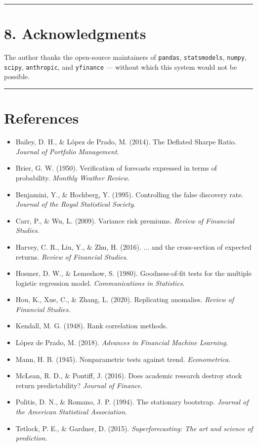 \documentclass[11pt,a4paper]{article}
\begin{document}
\medskip\hrule\medskip

\section{8. Acknowledgments}

The author thanks the open-source maintainers of \texttt{pandas}, \texttt{statsmodels}, \texttt{numpy}, \texttt{scipy}, \texttt{anthropic}, and \texttt{yfinance} — without which this system would not be possible.

\medskip\hrule\medskip

\section{References}

\begin{itemize}[leftmargin=*]
\item Bailey, D. H., \& López de Prado, M. (2014). The Deflated Sharpe Ratio. \textit{Journal of Portfolio Management}.
\item Brier, G. W. (1950). Verification of forecasts expressed in terms of probability. \textit{Monthly Weather Review}.
\item Benjamini, Y., \& Hochberg, Y. (1995). Controlling the false discovery rate. \textit{Journal of the Royal Statistical Society}.
\item Carr, P., \& Wu, L. (2009). Variance risk premiums. \textit{Review of Financial Studies}.
\item Harvey, C. R., Liu, Y., \& Zhu, H. (2016). ... and the cross-section of expected returns. \textit{Review of Financial Studies}.
\item Hosmer, D. W., \& Lemeshow, S. (1980). Goodness-of-fit tests for the multiple logistic regression model. \textit{Communications in Statistics}.
\item Hou, K., Xue, C., \& Zhang, L. (2020). Replicating anomalies. \textit{Review of Financial Studies}.
\item Kendall, M. G. (1948). Rank correlation methods.
\item López de Prado, M. (2018). \textit{Advances in Financial Machine Learning}.
\item Mann, H. B. (1945). Nonparametric tests against trend. \textit{Econometrica}.
\item McLean, R. D., \& Pontiff, J. (2016). Does academic research destroy stock return predictability? \textit{Journal of Finance}.
\item Politis, D. N., \& Romano, J. P. (1994). The stationary bootstrap. \textit{Journal of the American Statistical Association}.
\item Tetlock, P. E., \& Gardner, D. (2015). \textit{Superforecasting: The art and science of prediction}.
\end{itemize}
\end{document}

